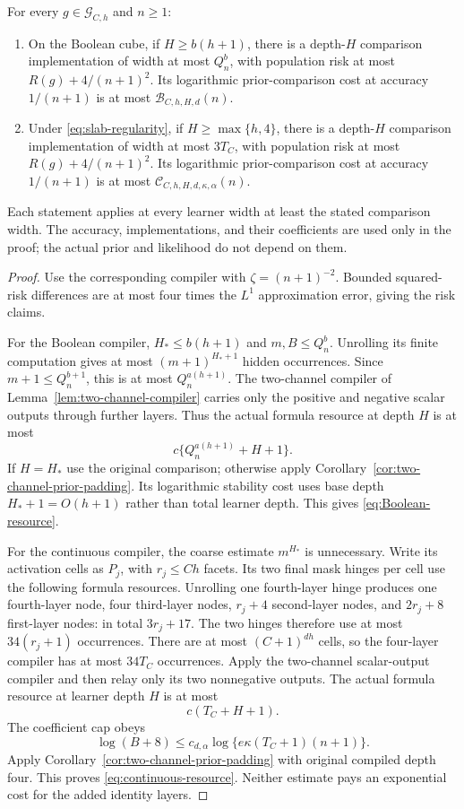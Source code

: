 \begin{lemma}
\label{lem:compiler-resources}
For every $g\in\mathcal G_{C,h}$ and $n\ge1$:
\begin{enumerate}
\item On the Boolean cube, if $H\ge b(h+1)$, there is a depth-$H$ comparison implementation of width at most $Q_n^b$, with population risk at most $R(g)+4/(n+1)^2$. Its logarithmic prior-comparison cost at accuracy $1/(n+1)$ is at most $\mathcal B_{C,h,H,d}(n)$.
\item Under \eqref{eq:slab-regularity}, if $H\ge\max\{h,4\}$, there is a depth-$H$ comparison implementation of width at most $3T_C$, with population risk at most $R(g)+4/(n+1)^2$. Its logarithmic prior-comparison cost at accuracy $1/(n+1)$ is at most $\mathcal C_{C,h,H,d,\kappa,\alpha}(n)$.
\end{enumerate}
Each statement applies at every learner width at least the stated comparison width. The accuracy, implementations, and their coefficients are used only in the proof; the actual prior and likelihood do not depend on them.
\end{lemma}
\begin{proof}
Use the corresponding compiler with $\zeta=(n+1)^{-2}$. Bounded squared-risk differences are at most four times the $L^1$ approximation error, giving the risk claims.

For the Boolean compiler, $H_*\le b(h+1)$ and $m,B\le Q_n^b$. Unrolling its finite computation gives at most $(m+1)^{H_*+1}$ hidden occurrences. Since $m+1\le Q_n^{b+1}$, this is at most $Q_n^{a(h+1)}$. The two-channel compiler of Lemma~\ref{lem:two-channel-compiler} carries only the positive and negative scalar outputs through further layers. Thus the actual formula resource at depth $H$ is at most
\[
 c\{Q_n^{a(h+1)}+H+1\}.
\]
If $H=H_*$ use the original comparison; otherwise apply Corollary~\ref{cor:two-channel-prior-padding}. Its logarithmic stability cost uses base depth $H_*+1=O(h+1)$ rather than total learner depth. This gives \eqref{eq:Boolean-resource}.

For the continuous compiler, the coarse estimate $m^{H_*}$ is unnecessary. Write its activation cells as $P_j$, with $r_j\le Ch$ facets. Its two final mask hinges per cell use the following formula resources. Unrolling one fourth-layer hinge produces one fourth-layer node, four third-layer nodes, $r_j+4$ second-layer nodes, and $2r_j+8$ first-layer nodes: in total $3r_j+17$. The two hinges therefore use at most $34(r_j+1)$ occurrences. There are at most $(C+1)^{dh}$ cells, so the four-layer compiler has at most $34T_C$ occurrences. Apply the two-channel scalar-output compiler and then relay only its two nonnegative outputs. The actual formula resource at learner depth $H$ is at most
\[
 c(T_C+H+1).
\]
The coefficient cap obeys
\[
 \log(B+8)\le c_{d,\alpha}
       \log\{e\kappa(T_C+1)(n+1)\}.
\]
Apply Corollary~\ref{cor:two-channel-prior-padding} with original compiled depth four. This proves \eqref{eq:continuous-resource}. Neither estimate pays an exponential cost for the added identity layers.
\end{proof}

